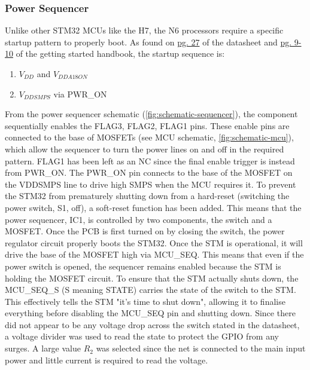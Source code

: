 \documentclass[10pt]{article}
\newcommand{\nl}{\newline \newline}
\begin{document}
\subsubsection{Power Sequencer}
Unlike other STM32 MCUs like the H7, the N6 processors require a specific startup pattern to properly boot.
As found on \href{https://www.st.com/resource/en/datasheet/stm32n657a0.pdf}{pg. 27} of the datasheet and \href{https://www.st.com/resource/en/application_note/an5967-getting-started-with-hardware-development-for-stm32n6-mcus-stmicroelectronics.pdf}{pg. 9-10} of the getting started handbook, the startup sequence is:
\begin{enumerate}
    \item $V_{DD}$ and $V_{DDA18ON}$
    \item $V_{DDSMPS}$ via PWR\_ON
\end{enumerate}
From the power sequencer schematic (\autoref{fig:schematic-sequencer}), the component sequentially enables the FLAG3, FLAG2, FLAG1 pins.
These enable pins are connected to the base of MOSFETs (see MCU schematic, \autoref{fig:schematic-mcu}), which allow the sequencer to turn the power lines on and off in the required pattern. 
FLAG1 has been left as an NC since the final enable trigger is instead from PWR\_ON. The PWR\_ON pin connects to the base of the MOSFET on the VDDSMPS line to drive high SMPS when the MCU requires it.
\nl
To prevent the STM32 from prematurely shutting down from a hard-reset (switching the power switch, S1, off), a soft-reset function has been added. This means that the power sequencer, IC1, is controlled by two components, the switch and a MOSFET.
Once the PCB is first turned on by closing the switch, the power regulator circuit properly boots the STM32. Once the STM is operational, it will drive the base of the MOSFET high via MCU\_SEQ.
This means that even if the power switch is opened, the sequencer remains enabled because the STM is holding the MOSFET circuit. To ensure that the STM actually shuts down, the MCU\_SEQ\_S (S meaning STATE) carries the state of the switch to the STM.
This effectively tells the STM "it's time to shut down", allowing it to finalise everything before disabling the MCU\_SEQ pin and shutting down.
\nl
Since there did not appear to be any voltage drop across the switch stated in the datasheet, a voltage divider was used to read the state to protect the GPIO from any surges. A large value $R_2$ was selected since the net is connected to the main input power and little current is required to read the voltage.
\end{document}
